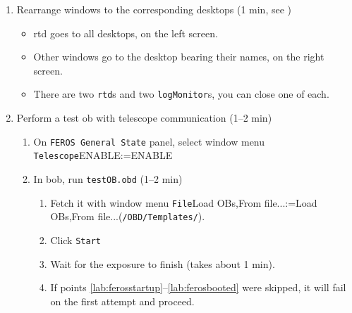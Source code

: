 \documentclass[11pt,fleqn,a4paper]{book}
\makeatletter
\def\menu#1#2{\texttt{#1}\ifx{}#2\else\@for\@x:=#2\do{$\rightarrow$\texttt{\@x}}\fi}
\def\wmenu#1#2{window menu \menu{#1}{#2}}
\def\fetchob{\wmenu{File}{Load OBs,From file...}}
\makeatother
\begin{document}
\begin{enumerate}
\begin{enumerate}
\begin{enumerate}
                \item A large, grey window giving details on the process should open.\\If a timeout error occurs, see .    
                \item Wait for the large, grey window to close itself (3 min)
                \item\label{lab:ferosonline} Put the instrument online (1 min)
                \begin{enumerate}
                   \item On \texttt{FEROS \gls{General State}} panel, use \wmenu{Instrument}{ONLINE}
                   \item Wait for \texttt{State} to indicate \texttt{ONLINE}
                \end{enumerate}
            \end{enumerate}
         \item \label{lab:ferosbooted} Rearrange windows to the corresponding \gls{desktop}s (1 min, see )
            \begin{itemize}
              \item \gls{rtd} goes to all \gls{desktop}s, on the left screen.
              \item Other windows go to the \gls{desktop} bearing their names, on the right screen.
              \item There are two \texttt{rtd}s and two \texttt{logMonitor}s, you can close one of each.
           \end{itemize}
         \item Perform a test \gls{ob} with telescope communication (1--2 min)
           \begin{enumerate}
             \item On \texttt{FEROS \gls{General State}} panel, select \wmenu{Telescope}{ENABLE} 
             \item In \gls{bob}, run \texttt{testOB.obd} (1--2 min)
             \begin{enumerate}
               \item Fetch it with \fetchob (\texttt{/OBD/Templates/}).
               \item \label{list:ferostestob} Click \texttt{Start} 
               \item Wait for the exposure to finish (takes about 1 min).
               \item If points \ref{lab:ferosstartup}--\ref{lab:ferosbooted} were skipped, it will fail on the first attempt and proceed.

\end{enumerate}
\end{enumerate}
\end{enumerate}
\end{enumerate}
\end{document}
